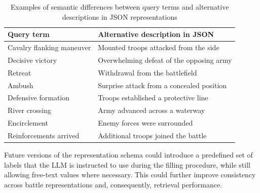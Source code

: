 \begin{table}[H]
    \centering
    \caption{Examples of semantic differences between query terms and alternative descriptions in JSON representations}
    \label{tab:query_json_semantic_differences}

    \small
    \renewcommand{\arraystretch}{1.4}
    \setlength{\tabcolsep}{6pt}

    \begin{tabular}{
        >{\raggedright\arraybackslash}p{}
        >{\raggedright\arraybackslash}p{}
    }
        \toprule
        \textbf{Query term} &
        \textbf{Alternative description in JSON} \\
        \midrule

        Cavalry flanking maneuver &
        Mounted troops attacked from the side \\
        \midrule

        Decisive victory &
        Overwhelming defeat of the opposing army \\
        \midrule

        Retreat &
        Withdrawal from the battlefield \\
        \midrule

        Ambush &
        Surprise attack from a concealed position \\
        \midrule

        Defensive formation &
        Troops established a protective line \\
        \midrule

        River crossing &
        Army advanced across a waterway \\
        \midrule

        Encirclement &
        Enemy forces were surrounded \\
        \midrule

        Reinforcements arrived &
        Additional troops joined the battle \\

        \bottomrule
    \end{tabular}
\end{table}
Future versions of the representation schema could introduce a predefined set of labels that the LLM is instructed to use during the filling procedure, while still allowing free-text values where necessary. This could further improve consistency across battle representations and, consequently, retrieval performance.
